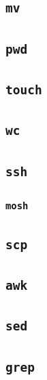 \documentclass[
]{book}
\begin{document}
\hypertarget{mv}{%
\subsection{\texorpdfstring{\texttt{mv}}{mv}}\label{mv}}

\hypertarget{pwd}{%
\subsection{\texorpdfstring{\texttt{pwd}}{pwd}}\label{pwd}}

\hypertarget{touch}{%
\subsection{\texorpdfstring{\texttt{touch}}{touch}}\label{touch}}

\hypertarget{wc}{%
\subsection{\texorpdfstring{\texttt{wc}}{wc}}\label{wc}}

\hypertarget{ssh}{%
\subsection{\texorpdfstring{\texttt{ssh}}{ssh}}\label{ssh}}

\hypertarget{mosh}{%
\subsubsection{\texorpdfstring{\texttt{mosh}}{mosh}}\label{mosh}}

\hypertarget{scp}{%
\subsection{\texorpdfstring{\texttt{scp}}{scp}}\label{scp}}

\hypertarget{awk}{%
\subsection{\texorpdfstring{\texttt{awk}}{awk}}\label{awk}}

\hypertarget{sed}{%
\subsection{\texorpdfstring{\texttt{sed}}{sed}}\label{sed}}

\hypertarget{grep}{%
\subsection{\texorpdfstring{\texttt{grep}}{grep}}\label{grep}}
\end{document}
